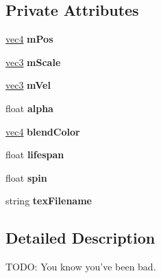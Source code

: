 \subsection*{Private Attributes}
\begin{DoxyCompactItemize}
\item 
\hypertarget{class_particle_a3d51791a544fb2cbf2e93531b3626132}{\hyperlink{struct_angel_1_1vec4}{vec4} {\bfseries m\-Pos}}\label{class_particle_a3d51791a544fb2cbf2e93531b3626132}

\item 
\hypertarget{class_particle_ad18c1ecffb2e5d032732d4cd058bb986}{\hyperlink{struct_angel_1_1vec3}{vec3} {\bfseries m\-Scale}}\label{class_particle_ad18c1ecffb2e5d032732d4cd058bb986}

\item 
\hypertarget{class_particle_a4cd8cbbc5b05126133df8246611339f2}{\hyperlink{struct_angel_1_1vec3}{vec3} {\bfseries m\-Vel}}\label{class_particle_a4cd8cbbc5b05126133df8246611339f2}

\item 
\hypertarget{class_particle_a14af67b37c2acfcbaffcc766b660a5f6}{float {\bfseries alpha}}\label{class_particle_a14af67b37c2acfcbaffcc766b660a5f6}

\item 
\hypertarget{class_particle_a3ec1cf194290dd222d3894e30a111db0}{\hyperlink{struct_angel_1_1vec4}{vec4} {\bfseries blend\-Color}}\label{class_particle_a3ec1cf194290dd222d3894e30a111db0}

\item 
\hypertarget{class_particle_a08108b2a0a2c0ec96f235510cc9aa0a2}{float {\bfseries lifespan}}\label{class_particle_a08108b2a0a2c0ec96f235510cc9aa0a2}

\item 
\hypertarget{class_particle_a73e6af7e8d30f1cbf570cc93fbe6529e}{float {\bfseries spin}}\label{class_particle_a73e6af7e8d30f1cbf570cc93fbe6529e}

\item 
\hypertarget{class_particle_a639147e87ea9fd39b04ac3bafb6ff97b}{string {\bfseries tex\-Filename}}\label{class_particle_a639147e87ea9fd39b04ac3bafb6ff97b}

\end{DoxyCompactItemize}


\subsection{Detailed Description}
T\-O\-D\-O\-: You know you've been bad. 

